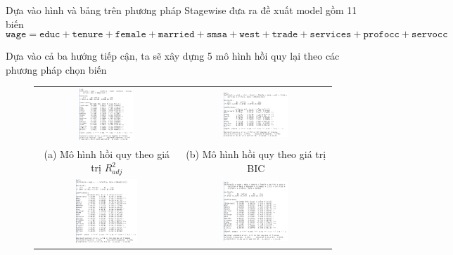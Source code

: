 Dựa vào hình và bảng trên phương pháp Stagewise đưa ra đề xuất model gồm 11 biến
\[\texttt{wage} = \texttt{educ} + \texttt{tenure} + \texttt{female} + \texttt{married} + \texttt{smsa} + \texttt{west} + \texttt{trade} + \texttt{services} + \texttt{profocc} + \texttt{servocc} \]

Dựa vào cả ba hướng tiếp cận, ta sẽ xây dựng 5 mô hình hồi quy lại theo các phương pháp chọn biến

\begin{figure}[H]
	\begin{tabular}{cc}
		\centering
		\includegraphics[width=0.4\textwidth]{../Photo Of Result/model-R-4} &   \includegraphics[width=0.45\textwidth]{../Photo Of Result/model-BIC-4} \\
		(a) Mô hình hồi quy theo giá trị $R^2_{adj}$  & (b) Mô hình hồi quy theo giá trị BIC \\[6pt]
		\includegraphics[width=0.45\textwidth]{../Photo Of Result/model-Cp-4} &   \includegraphics[width=0.45\textwidth]{../Photo Of Result/model-stepwise-aic-4} \\

\end{tabular}
\end{figure}
